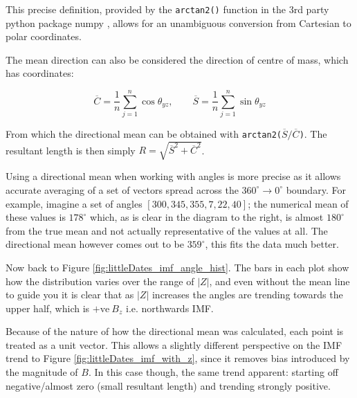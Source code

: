 \documentclass[12pt]{article}
\newcommand{\incfig}[2][1]{
    \def\svgwidth{#1\textwidth}
    
}
\newenvironment{Figure}
  {\par\medskip\noindent\minipage{\linewidth}}
  {\endminipage\par\medskip}
\begin{document}
\noindent This precise definition, provided by the \verb|arctan2()| \cite{arctan2} function in the 3rd party python package numpy \cite{numpy}, allows for an unambiguous conversion from Cartesian to polar coordinates. 

\noindent The mean direction can also be considered the direction of centre of mass, which has coordinates:

\begin{equation}
    \overline{C} = \frac{1}{n}\sum_{j=1}^n \cos\theta_{yz}, \qquad \overline{S}=\frac{1}{n}\sum_{j=1}^n\sin\theta_{yz}
\end{equation}

From which the directional mean can be obtained with \verb|arctan2(|$\overline{S}/\overline{C}$\verb|)|. The resultant length is then simply $R=\sqrt{\overline{S}^2+\overline{C}^2}$.

\begin{Figure}
    \centering
    \incfig[0.3]{angleExample}
    \hspace{2cm}
    \incfig[0.3]{angleReference}
\end{Figure}

\noindent Using a directional mean when working with angles is more precise as it allows accurate averaging of a set of vectors spread across the $360^\circ\rightarrow0^\circ$ boundary. For example, imagine a set of angles $[300, 345, 355, 7, 22, 40]$; the numerical mean of these values is $178^\circ$ which, as is clear in the diagram to the right, is almost $180^\circ$ from the true mean and not actually representative of the values at all. The directional mean however comes out to be $359^\circ$, this fits the data much better.

Now back to Figure \ref{fig:littleDates_imf_angle_hist}. The bars in each plot show how the distribution varies over the range of $|Z|$, and even without the mean line to guide you it is clear that as $|Z|$ increases the angles are trending towards the upper half, which is $+\text{ve}\ B_z$ i.e. northwards IMF.

Because of the nature of how the directional mean was calculated, each point is treated as a unit vector. This allows a slightly different perspective on the IMF trend to Figure \ref{fig:littleDates_imf_with_z}, since it removes bias introduced by the magnitude of $B$. In this case though, the same trend apparent: starting off negative/almost zero (small resultant length) and trending strongly positive.
\end{document}
